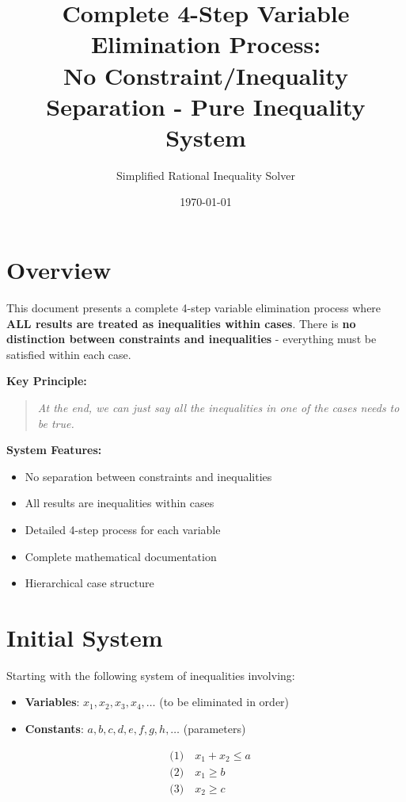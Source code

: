 \documentclass{article}
\title{Complete 4-Step Variable Elimination Process: \\
No Constraint/Inequality Separation - Pure Inequality System}
\author{Simplified Rational Inequality Solver}
\date{\today}
\begin{document}
\maketitle

\section{Overview}

This document presents a complete 4-step variable elimination process where
\textbf{ALL results are treated as inequalities within cases}. There is
\textbf{no distinction between constraints and inequalities} - everything
must be satisfied within each case.

\textbf{Key Principle:}
\begin{quote}
\textit{At the end, we can just say all the inequalities in one of the cases needs to be true.}
\end{quote}

\textbf{System Features:}
\begin{itemize}
\item No separation between constraints and inequalities
\item All results are inequalities within cases
\item Detailed 4-step process for each variable
\item Complete mathematical documentation
\item Hierarchical case structure
\end{itemize}

\section{Initial System}

Starting with the following system of inequalities involving:
\begin{itemize}
\item \textbf{Variables}: $x_1, x_2, x_3, x_4, \ldots$ (to be eliminated in order)
\item \textbf{Constants}: $a, b, c, d, e, f, g, h, \ldots$ (parameters)
\end{itemize}

\begin{align}
& \text{(1)} \quad x_{1} + x_{2} \leq a \\
& \text{(2)} \quad x_{1} \geq b \\
& \text{(3)} \quad x_{2} \geq c \\
\end{align}
\end{document}
